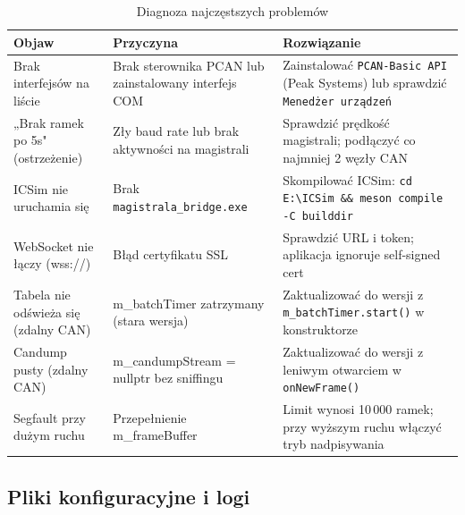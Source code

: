 \documentclass[12pt, a4paper]{article}
\begin{document}
\begin{table}[H]
\caption{Diagnoza najczęstszych problemów}
\label{tab:service}
\centering
\small
\begin{tabular}{p{4.2cm}p{4.2cm}p{4.2cm}}
\toprule
\textbf{Objaw} & \textbf{Przyczyna} & \textbf{Rozwiązanie} \\
\midrule
Brak interfejsów na liście &
Brak sterownika PCAN lub zainstalowany interfejs COM &
Zainstalować \texttt{PCAN-Basic API} (Peak Systems) lub sprawdzić \texttt{Menedżer urządzeń} \\

„Brak ramek po 5s" (ostrzeżenie) &
Zły baud rate lub brak aktywności na magistrali &
Sprawdzić prędkość magistrali; podłączyć co najmniej 2 węzły CAN \\

ICSim nie uruchamia się &
Brak \texttt{magistrala\_bridge.exe} &
Skompilować ICSim: \texttt{cd E:\textbackslash ICSim \&\& meson compile -C builddir} \\

WebSocket nie łączy (wss://) &
Błąd certyfikatu SSL &
Sprawdzić URL i token; aplikacja ignoruje self-signed cert \\

Tabela nie odświeża się (zdalny CAN) &
m\_batchTimer zatrzymany (stara wersja) &
Zaktualizować do wersji z \texttt{m\_batchTimer.start()} w konstruktorze \\

Candump pusty (zdalny CAN) &
m\_candumpStream = nullptr bez sniffingu &
Zaktualizować do wersji z leniwym otwarciem w \texttt{onNewFrame()} \\

Segfault przy dużym ruchu &
Przepełnienie m\_frameBuffer &
Limit wynosi 10\,000 ramek; przy wyższym ruchu włączyć tryb nadpisywania \\
\bottomrule
\end{tabular}
\end{table}

\subsection{Pliki konfiguracyjne i logi}
\end{document}
